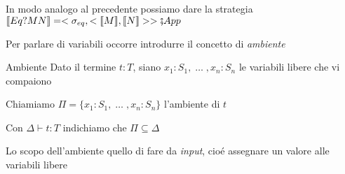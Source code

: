 \documentclass{beamer}
\begin{document}
\begin{frame}
			
	
	In modo analogo al precedente possiamo dare la strategia $\llbracket Eq? M N \rrbracket=<\sigma_{eq}, < \llbracket M \rrbracket , \llbracket N \rrbracket > > \fatsemi App$
	
	
\end{frame}






\begin{frame}
	
	Per parlare di variabili occorre introdurre il concetto di \emph{ambiente}
	
	\begin{block}{Ambiente}
		Dato il termine $t:T$, siano $x_1:S_1 ,\; \dots \; ,x_n :S_n$ le variabili libere che vi compaiono
		
		Chiamiamo $\Pi = \{ x_1:S_1 , \; \dots \; ,x_n :S_n \}$ l'ambiente di $t$
		
	\end{block}
	
	Con $\Delta \vdash t:T$ indichiamo che $\Pi \subseteq \Delta$
	
	Lo scopo dell'ambiente quello di fare da \emph{input}, cioé assegnare un valore alle variabili libere
	
	
	
\end{frame}
\end{document}

